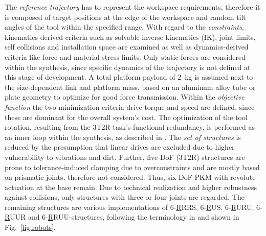 \documentclass[runningheads]{llncs}
\begin{document}
The \emph{reference trajectory} has to represent the workspace requirements, therefore it is composed of target positions at the edge of the workspace and random tilt angles of the tool within the specified range. 
With regard to the \emph{constraints}, kinematics-derived criteria such as solvable inverse kinematics (IK), joint limits, self collisions and installation space are examined as well as dynamics-derived criteria like force and material stress limits. %
Only static forces are considered within the synthesis, since specific dynamics of the trajectory is not defined at this stage of development.  
A total platform payload of \SI{2}{\kilo\gram} is assumed next to the size-dependent link and platform mass, based on an aluminum alloy tube or plate geometry to optimize for good force transmission.
Within the \emph{objective function} the two minimization criteria drive torque and speed are defined, since these are dominant for the overall system's cost. 
The optimization of the tool rotation, resulting from the 3T2R task's functional redundancy, is performed as an inner loop within the synthesis, as described in \cite{Schappler2022_ARK_3T1R}.
The \emph{set of structures} is reduced by the presumption that linear drives are excluded due to higher vulnerability to vibrations and dirt. 
Further, five-DoF (3T2R) structures are prone to tolerance-induced clamping due to overconstraints and are mostly based on prismatic joints, therefore not considered.
Thus, six-DoF PKM with revolute actuation at the base remain. %
Due to technical realization and higher robustness against collisions, only structures with three or four joints are regarded. 
The remaining structures are various implementations of 6-\underline{R}RRS, 6-\underline{R}US, 6-\underline{R}URU, 6-\underline{R}UUR and 6-\underline{R}RUU-structures, following the terminology in \cite{Merlet2006} and shown in Fig.~\ref{fig:robots}. 
\end{document}
